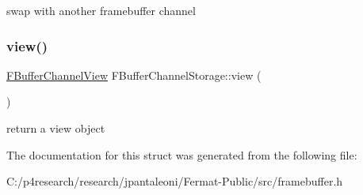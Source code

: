 swap with another framebuffer channel \mbox{\label{struct_f_buffer_channel_storage_a1be90e5b134cb810c2497a66d2ac7b12}} 
\subsubsection{\texorpdfstring{view()}{view()}}
{\footnotesize\ttfamily \hyperlink{struct_f_buffer_channel_view}{F\+Buffer\+Channel\+View} F\+Buffer\+Channel\+Storage\+::view (\begin{DoxyParamCaption}{ }\end{DoxyParamCaption})\hspace{0.3cm}{\ttfamily [inline]}}

return a view object 

The documentation for this struct was generated from the following file\+:\begin{DoxyCompactItemize}
\item 
C\+:/p4research/research/jpantaleoni/\+Fermat-\/\+Public/src/framebuffer.\+h\end{DoxyCompactItemize}
